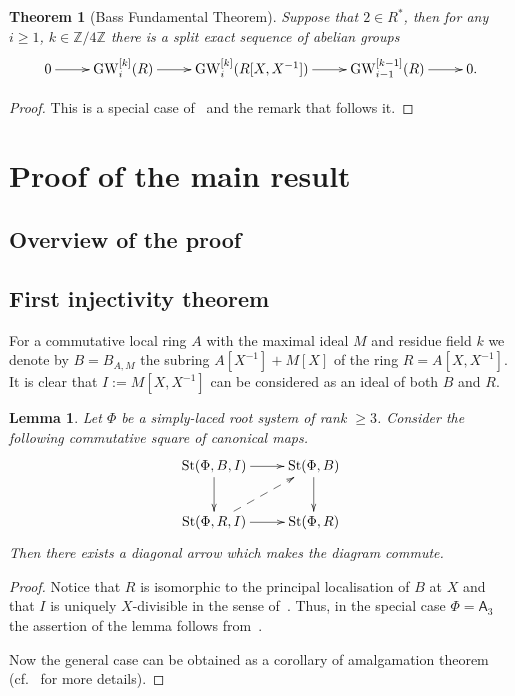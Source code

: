 \documentclass[oneside, 10pt]{amsart}
\newtheorem{theorem}{Theorem}
\newtheorem{lemma}{Lemma}
\theoremstyle{remark}
\theoremstyle{definition}
\DeclareMathOperator{\St}{St}
\DeclareMathOperator{\GW}{GW}
\newcommand{\ZZ}{\mathbb{Z}}
\newcommand{\rA}{\mathsf{A}}
\numberwithin{equation}{section}
\begin{document}
\begin{theorem}[Bass Fundamental Theorem]\label{bass-ft} Suppose that $2 \in R^*$, then for any $i\geq 1$, $k\in \ZZ/4\ZZ$ there is a split exact sequence of abelian groups
 \[ \xymatrix{ 0 \ar[r] & \GW_i^{[k]}(R) \ar[r] &  \GW_i^{[k]}(R[X, X^{-1}]) \ar[r]  & \GW_{i-1}^{[k-1]}(R) \ar[r] & 0.} \] \end{theorem}
\begin{proof} This is a special case of~\cite[Theorem~9.13]{Sch16} and the remark that follows it. \end{proof}

\section{Proof of the main result}
\subsection{Overview of the proof}
\subsection{First injectivity theorem}
For a commutative local ring $A$ with the maximal ideal $M$ and residue field $k$
we denote by $B = B_{A, M}$ the subring $A[X^{-1}] + M[X]$ of the ring $R = A[X, X^{-1}]$.
It is clear that $I := M[X, X^{-1}]$ can be considered as an ideal of both $B$ and $R$.
\begin{lemma}\label{lem:lemma32} Let $\Phi$ be a simply-laced root system of rank $\geq 3$.
Consider the following commutative square of canonical maps.
\[ \xymatrix{
    \St(\Phi, B, I) \ar[r] \ar[d] & \St(\Phi, B) \ar[d] \\
    \St(\Phi, R, I) \ar[r] \ar@{-->}[ur] & \St(\Phi, R)
   } \]
Then there exists a diagonal arrow which makes the diagram commute.   
\end{lemma} 
\begin{proof}
 Notice that $R$ is isomorphic to the principal localisation of $B$ at $X$
  and that $I$ is uniquely $X$-divisible in the sense of~\cite[\S~4]{LS17}.
 Thus, in the special case $\Phi = \rA_3$ the assertion of the lemma follows from~\cite[Theorem~3]{LS17}.
 
 Now the general case can be obtained as a corollary of amalgamation theorem~\cite[Theorem~9]{S15}
  (cf.~\cite[\S~4]{LS17} for more details).
\end{proof}
\end{document}
